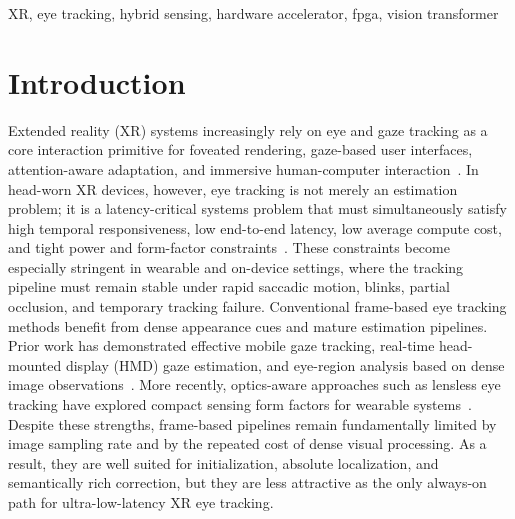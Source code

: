 \documentclass[journal]{IEEEtran}
\begin{document}
\begin{IEEEkeywords}
XR, eye tracking, hybrid sensing, hardware accelerator, fpga, vision transformer
\end{IEEEkeywords}
\section{Introduction}
Extended reality (XR) systems increasingly rely on eye and gaze tracking as a core interaction primitive for foveated rendering, gaze-based user interfaces, attention-aware adaptation, and immersive human-computer interaction~\cite{plopski2022eye,kwon2023xrbench}. In head-worn XR devices, however, eye tracking is not merely an estimation problem; it is a latency-critical systems problem that must simultaneously satisfy high temporal responsiveness, low end-to-end latency, low average compute cost, and tight power and form-factor constraints~\cite{plopski2022eye,kwon2023xrbench}. These constraints become especially stringent in wearable and on-device settings, where the tracking pipeline must remain stable under rapid saccadic motion, blinks, partial occlusion, and temporary tracking failure.
%
Conventional frame-based eye tracking methods benefit from dense appearance cues and mature estimation pipelines. Prior work has demonstrated effective mobile gaze tracking, real-time head-mounted display (HMD) gaze estimation, and eye-region analysis based on dense image observations~\cite{li2018etracker,feng2022real,chen2022real}. More recently, optics-aware approaches such as lensless eye tracking have explored compact sensing form factors for wearable systems~\cite{jain2025flattrack}. Despite these strengths, frame-based pipelines remain fundamentally limited by image sampling rate and by the repeated cost of dense visual processing. As a result, they are well suited for initialization, absolute localization, and semantically rich correction, but they are less attractive as the only always-on path for ultra-low-latency XR eye tracking.
%
\end{document}
